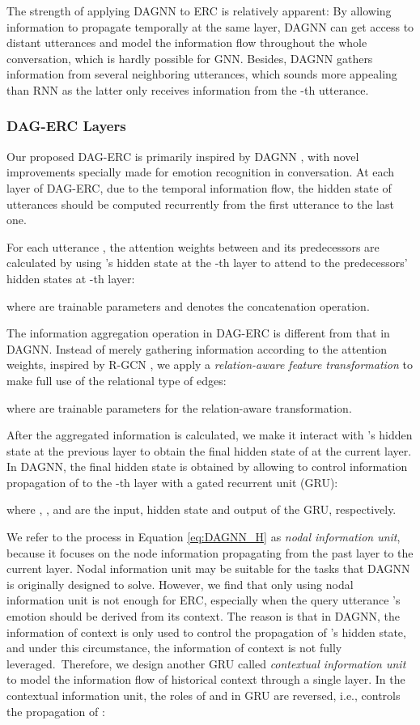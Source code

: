 \documentclass[11pt,a4paper]{article}
\begin{document}
The strength of applying DAGNN to ERC is relatively apparent: By allowing information to propagate temporally at the same layer, DAGNN can get access to distant utterances and model the information flow throughout the whole conversation, which is hardly possible for GNN. Besides, DAGNN gathers information from several neighboring utterances, which sounds more appealing than RNN as the latter only receives information from the -th utterance.

\subsubsection{DAG-ERC Layers}
Our proposed DAG-ERC is primarily inspired by DAGNN \citep{thost2021directed}, with novel improvements specially made for emotion recognition in conversation. 
At each layer  of DAG-ERC, due to the temporal information flow, the hidden state of utterances should be computed recurrently from the first utterance to the last one.

For each utterance , the attention weights between  and its predecessors are calculated by using 's hidden state at the -th layer to attend to the predecessors' hidden states at -th layer:

where  are trainable parameters and  denotes the concatenation operation.

The information aggregation operation in DAG-ERC is different from that in DAGNN. Instead of merely gathering information according to the attention weights, inspired by R-GCN \citep{schlichtkrull2018modeling}, we apply a \emph{relation-aware feature transformation} to make full use of the relational type of edges:

where   are trainable parameters for the relation-aware transformation. 

After the aggregated information  is calculated, we make it interact with 's hidden state at the previous layer  to obtain the final hidden state of  at the current layer. 
In DAGNN, the final hidden state is obtained by allowing  to control information propagation of  to the -th layer with a gated recurrent unit (GRU):

where , , and  are the input, hidden state and output of the GRU, respectively.

We refer to the process in Equation \ref{eq:DAGNN_H} as \emph{nodal information unit}, because it focuses on the node information propagating from the past layer to the current layer. Nodal information unit may be suitable for the tasks that DAGNN is originally designed to solve.
However, we find that only using nodal information unit is not enough for ERC, especially when the query utterance 's emotion should be derived from its context. 
The reason is that in DAGNN, the information of context  is only used to control the propagation of 's hidden state, and under this circumstance, the information of context is not fully leveraged.~Therefore, we design another GRU called \emph{contextual information unit} to model the information flow of historical context through a single layer. In the contextual information unit, the roles of  and  in GRU are reversed, i.e.,  controls the propagation of :
\end{document}
